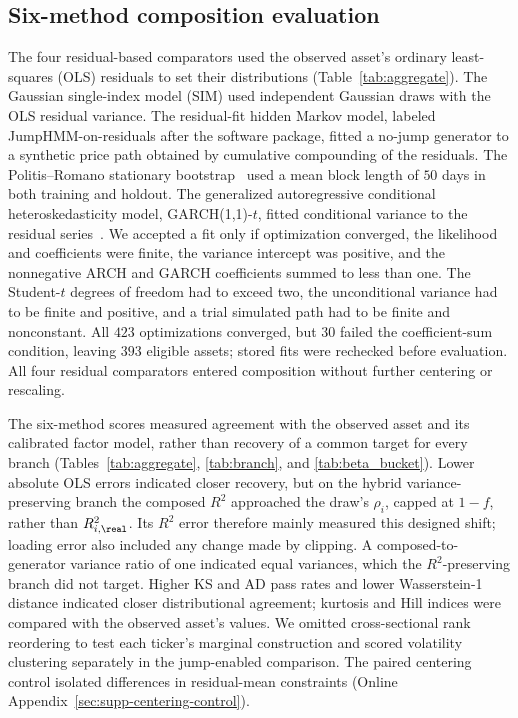 \subsection{Six-method composition evaluation}
\label{sec:supp-composition-evaluation}

The four residual-based comparators used the observed asset's
ordinary least-squares (OLS) residuals to set their distributions
(Table~\ref{tab:aggregate}). The Gaussian single-index model (SIM)
used independent Gaussian draws with the OLS residual variance. The
residual-fit hidden Markov model, labeled JumpHMM-on-residuals after
the software package, fitted a no-jump generator to a synthetic price
path obtained by cumulative compounding of the residuals. The
Politis--Romano stationary bootstrap~\cite{politisRomano1994} used a
mean block length of $50$ days in both training and holdout. The
generalized autoregressive conditional heteroskedasticity model,
GARCH(1,1)-$t$, fitted conditional variance to the residual
series~\cite{bollerslev1986}. We accepted a fit only if optimization
converged, the likelihood and coefficients were finite, the variance
intercept was positive, and the nonnegative ARCH and GARCH
coefficients summed to less than one. The Student-$t$ degrees of
freedom had to exceed two, the unconditional variance had to be finite
and positive, and a trial simulated path had to be finite and
nonconstant. All $423$ optimizations converged, but $30$ failed the
coefficient-sum condition, leaving $393$ eligible assets; stored fits
were rechecked before evaluation. All four residual
comparators entered composition without further centering or
rescaling.

The six-method scores measured agreement with the observed asset and
its calibrated factor model, rather than recovery of a common target
for every branch (Tables~\ref{tab:aggregate}, \ref{tab:branch}, and
\ref{tab:beta_bucket}). Lower absolute OLS errors indicated closer
recovery, but on the hybrid variance-preserving branch the composed
$R^2$ approached the draw's $\rho_i$, capped at $1-f$, rather than
$R^2_{i,\real}$. Its $R^2$ error therefore mainly measured this
designed shift; loading error also included any change made by
clipping. A composed-to-generator variance ratio of one indicated
equal variances, which the $R^2$-preserving branch did not target.
Higher KS and AD pass rates and lower Wasserstein-1 distance indicated
closer distributional agreement; kurtosis and Hill indices were
compared with the observed asset's values. We omitted cross-sectional
rank reordering to test each ticker's marginal construction and
scored volatility clustering separately in the jump-enabled comparison.
The paired centering control isolated differences in residual-mean
constraints (Online Appendix~\ref{sec:supp-centering-control}).


